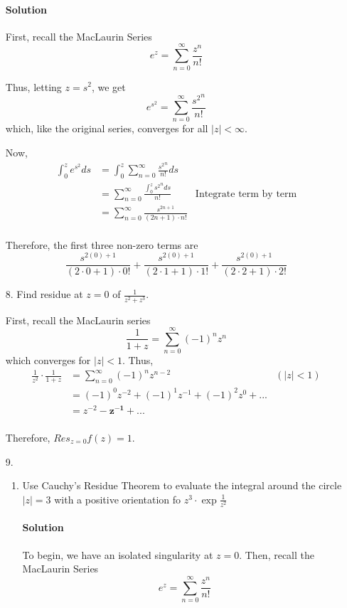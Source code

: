 \documentclass[11pt]{article}
\begin{document}
\begin{enumerate}
	\paragraph{Solution} 
	First, recall the MacLaurin Series
	\[e^z = \sum^{\infty}_{n=0} \frac{z^n}{n!} \]
	
	Thus, letting $z = s^2$, we get 
	\[e^{s^2} = \sum^{\infty}_{n=0} \frac{{s^2}^n}{n!} \]
	which, like the original series, converges for all $|z| < \infty$.
	
	Now,
	\[\begin{aligned}	
	\int_0^z e^{s^2} ds
	&= \int_0^z \sum^{\infty}_{n=0} \frac{{s^2}^n}{n!} ds \\
	&= \sum^{\infty}_{n=0} \frac{
		\int_0^z {s^2}^n ds }{n!} & \text{Integrate term by term} \\
	&= \sum^{\infty}_{n=0} \frac{s^{2n + 1}}{(2n + 1) \cdot n!} \\
	\end{aligned}\]
	
	Therefore, the first three non-zero terms are
	\[
	\frac{s^{2(0) + 1}}{(2\cdot0 + 1) \cdot 0!} + 
	\frac{s^{2(0) + 1}}{(2\cdot1 + 1) \cdot 1!} +
	\frac{s^{2(0) + 1}}{(2\cdot2 + 1) \cdot 2!}
	\]
	
	\item[8.] Find residue at $z = 0$ of $\frac{1}{z^2 + z^3}$. 
	
	First, recall the MacLaurin series
	\[ \frac{1}{1+z} = \sum^{\infty}_{n=0} (-1)^n z^n \]
	which converges for $|z| <1$. Thus,
	\[\begin{aligned}
	\frac{1}{z^2} \cdot \frac{1}{1+z}
	&= \sum^{\infty}_{n=0} (-1)^n z^{n-2} & (|z| < 1) \\
	&= (-1)^0 z^{-2} + (-1)^1 z^{-1} + (-1)^2 z^0 + ... \\
	&= z^{-2} - \mathbf{z^{-1}} + ... \\
	\end{aligned}\]
	
	Therefore, $Res_{z=0} f(z) = 1$.
	
	\item[9.]
		\begin{enumerate}
			\item Use Cauchy's Residue Theorem to evaluate the integral around the circle 
			$|z| = 3$ with a positive orientation fo $z^3 \cdot \exp{\frac{1}{z^2}}$
			
			\paragraph{Solution} To begin, we have an isolated singularity at $z = 0$. Then, recall the MacLaurin Series
			\[e^z = \sum^{\infty}_{n=0} \frac{z^n}{n!} \]
			

\end{enumerate}
\end{enumerate}
\end{document}
